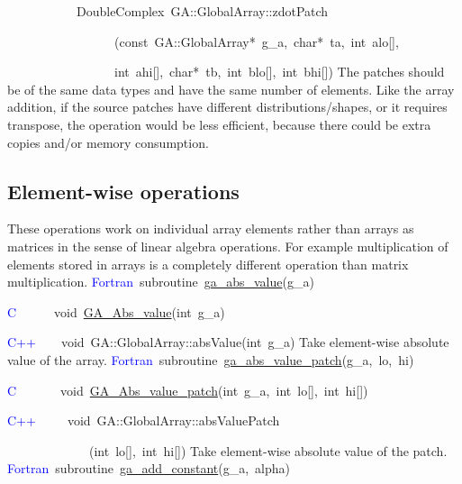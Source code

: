 ~~~~~~~~~~~DoubleComplex~GA::GlobalArray::zdotPatch

~~~~~~~~~~~~~~~~~(const~GA::GlobalArray{*}~g\_a,~char{*}~ta,~int~alo{[}{]},~

~~~~~~~~~~~~~~~~~int~ahi{[}{]},~char{*}~tb,~int~blo{[}{]},~int~bhi{[}{]})
The patches should be of the same data types and have the same number
of elements. Like the array addition, if the source patches have different
distributions/shapes, or it requires transpose, the operation would
be less efficient, because there could be extra copies and/or memory
consumption. 


\subsection{Element-wise operations }

These operations work on individual array elements rather than arrays
as matrices in the sense of linear algebra operations. For example
multiplication of elements stored in arrays is a completely different
operation than matrix multiplication.
\textcolor{blue}{Fortran}~subroutine~\href{http://www.emsl.pnl.gov/docs/global/ga_ops.html\#ga_abs_value}{ga\_{}abs\_{}value}(g\_a)~

\textcolor{blue}{C}~~~~~~void~\href{http://www.emsl.pnl.gov/docs/global/c_nga_ops.html\#ga_abs_value}{GA\_{}Abs\_{}value}(int~g\_a)

\textcolor{blue}{C++}~~~~void~GA::GlobalArray::absValue(int~g\_a)
Take element-wise absolute value of the array. 
\textcolor{blue}{Fortran}~subroutine~\href{http://www.emsl.pnl.gov/docs/global/ga_ops.html\#ga_abs_value_patch}{ga\_{}abs\_{}value\_{}patch}(g\_a,~lo,~hi)~

\textcolor{blue}{C}~~~~~~~void~\href{http://www.emsl.pnl.gov/docs/global/c_nga_ops.html\#ga_abs_value_patch}{GA\_{}Abs\_{}value\_{}patch}(int~g\_a,~int~lo{[}{]},~int~hi{[}{]})~

\textcolor{blue}{C++}~~~~~void~GA::GlobalArray::absValuePatch

~~~~~~~~~~~~~(int~lo{[}{]},~int~hi{[}{]})
Take element-wise absolute value of the patch.
\textcolor{blue}{Fortran}~subroutine~\href{http://www.emsl.pnl.gov/docs/global/ga_ops.html\#ga_add_constant}{ga\_{}add\_{}constant}(g\_a,~alpha)~

